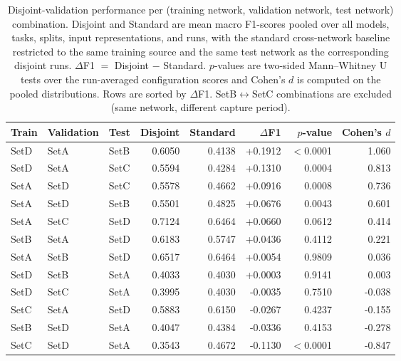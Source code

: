 \begin{table}
\caption{Disjoint-validation performance per (training network, validation network, test network) combination. Disjoint and Standard are mean macro F1-scores pooled over all models, tasks, splits, input representations, and runs, with the standard cross-network baseline restricted to the same training source and the same test network as the corresponding disjoint runs. $\Delta$F1 $=$ Disjoint $-$ Standard. $p$-values are two-sided Mann--Whitney U tests over the run-averaged configuration scores and Cohen's $d$ is computed on the pooled distributions. Rows are sorted by $\Delta$F1. SetB$\leftrightarrow$SetC combinations are excluded (same network, different capture period).}
\label{tab:q5_pairings}
\centering
\small
\begin{tabular}{lllrrrrr}
\toprule
Train & Validation & Test & Disjoint & Standard & $\Delta$F1 & $p$-value & Cohen's $d$ \\
\midrule
SetD & SetA & SetB & 0.6050 & 0.4138 & +0.1912 & $<$0.0001 & 1.060 \\
SetD & SetA & SetC & 0.5594 & 0.4284 & +0.1310 & 0.0004 & 0.813 \\
SetA & SetD & SetC & 0.5578 & 0.4662 & +0.0916 & 0.0008 & 0.736 \\
SetA & SetD & SetB & 0.5501 & 0.4825 & +0.0676 & 0.0043 & 0.601 \\
SetA & SetC & SetD & 0.7124 & 0.6464 & +0.0660 & 0.0612 & 0.414 \\
SetB & SetA & SetD & 0.6183 & 0.5747 & +0.0436 & 0.4112 & 0.221 \\
SetA & SetB & SetD & 0.6517 & 0.6464 & +0.0054 & 0.9809 & 0.036 \\
SetD & SetB & SetA & 0.4033 & 0.4030 & +0.0003 & 0.9141 & 0.003 \\
SetD & SetC & SetA & 0.3995 & 0.4030 & -0.0035 & 0.7510 & -0.038 \\
SetC & SetA & SetD & 0.5883 & 0.6150 & -0.0267 & 0.4237 & -0.155 \\
SetB & SetD & SetA & 0.4047 & 0.4384 & -0.0336 & 0.4153 & -0.278 \\
SetC & SetD & SetA & 0.3543 & 0.4672 & -0.1130 & $<$0.0001 & -0.847 \\
\bottomrule
\end{tabular}
\end{table}
